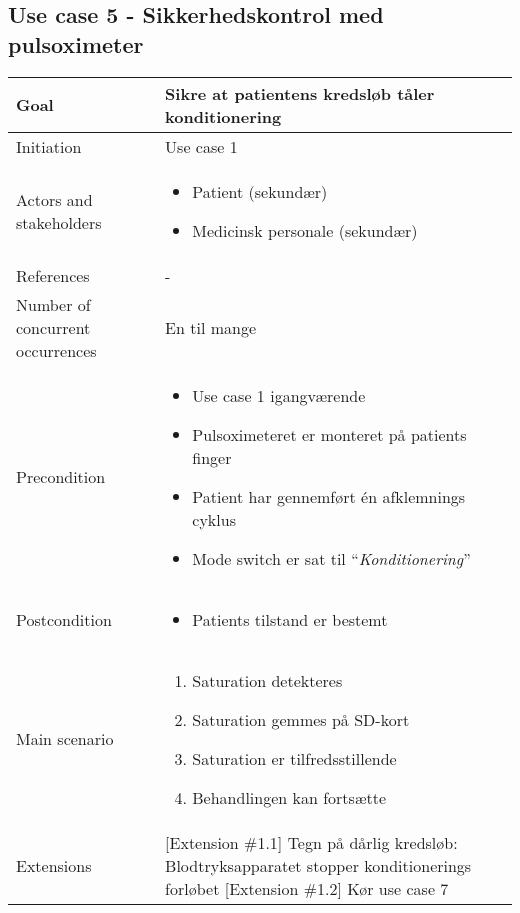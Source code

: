 	\subsection{Use case 5 - Sikkerhedskontrol med pulsoximeter}
		\begin{center}
			\begin{tabular}{ | m{4cm} | m{8cm}| } 
				\hline
				Goal& Sikre at patientens kredsløb tåler konditionering \\ 
				\hline
				Initiation &  Use case 1\\
				\hline
				Actors and stakeholders & 
				\begin{itemize}
					\item Patient (sekundær)
					\item Medicinsk personale (sekundær)
				\end{itemize} \\ 
				\hline
				References & - \\ 
				\hline
				Number of concurrent occurrences & En til mange \\ 
				\hline	
				Precondition & 
				\begin{itemize}
					\item Use case 1 igangværende
					\item Pulsoximeteret er monteret på patients finger
					\item Patient har gennemført én afklemnings cyklus
					\item Mode switch er sat til “\textit{Konditionering}”
 				\end{itemize} \\ 
				\hline
				Postcondition & 
				\begin{itemize}
					\item Patients tilstand er bestemt 
				\end{itemize} \\ 
				\hline
				Main scenario & \begin{enumerate}
					\setlength\itemsep{0cm} %
					\item Saturation detekteres
					\item Saturation gemmes på SD-kort
					\item Saturation er tilfredsstillende
					\subitem [Extension \#1.1][Extension \#1.2]
					\item Behandlingen kan fortsætte
				\end{enumerate} \\ 
				\hline
				Extensions &  [Extension \#1.1] Tegn på dårlig kredsløb: Blodtryksapparatet stopper konditionerings forløbet 
				[Extension \#1.2] Kør use case 7\\ 
				\hline
			\end{tabular}
		\end{center}
			\pagebreak